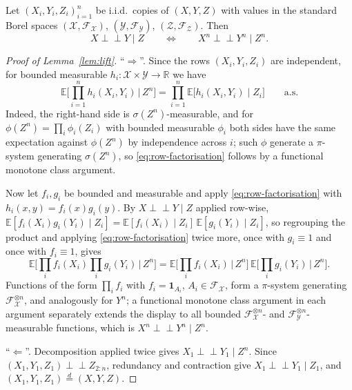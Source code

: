 \documentclass[twoside,11pt]{article}
\newcommand{\indep}{\perp \!\!\! \perp}
\begin{document}
\begin{lemma}\label{lem:lift}
Let $(X_i,Y_i,Z_i)_{i=1}^n$ be i.i.d.\ copies of $(X,Y,Z)$ with values in the
standard Borel spaces $(\mathcal X,\mathcal F_{\mathcal X})$,
$(\mathcal Y,\mathcal F_{\mathcal Y})$, $(\mathcal Z,\mathcal F_{\mathcal Z})$.
Then
\[
  X\indep Y\mid Z
  \qquad\Longleftrightarrow\qquad
  X^n\indep Y^n\mid Z^n .
\]
\end{lemma}
\begin{proof}[Proof of Lemma~\ref{lem:lift}]
``$\Rightarrow$''. Since the rows $(X_i,Y_i,Z_i)$ are independent, for bounded
measurable $h_i:\mathcal X\times\mathcal Y\to\mathbb R$ we have
\begin{equation}\label{eq:row-factorisation}
  \mathbb E\Big[\textstyle\prod_{i=1}^n h_i(X_i,Y_i)\,\Big|\,Z^n\Big]
  = \prod_{i=1}^n \mathbb E\big[h_i(X_i,Y_i)\mid Z_i\big]
  \qquad \text{a.s.}
\end{equation}
Indeed, the right-hand side is $\sigma(Z^n)$-measurable, and for
$\phi(Z^n)=\prod_i\phi_i(Z_i)$ with bounded measurable $\phi_i$ both sides have
the same expectation against $\phi(Z^n)$ by independence across $i$; such
$\phi$ generate a $\pi$-system generating $\sigma(Z^n)$, so
\eqref{eq:row-factorisation} follows by a functional monotone class argument.

Now let $f_i,g_i$ be bounded and measurable and apply
\eqref{eq:row-factorisation} with $h_i(x,y)=f_i(x)g_i(y)$. By $X\indep
Y\mid Z$ applied row-wise,
$\mathbb E[f_i(X_i)g_i(Y_i)\mid Z_i]=\mathbb E[f_i(X_i)\mid Z_i]\,
\mathbb E[g_i(Y_i)\mid Z_i]$, so regrouping the product and applying
\eqref{eq:row-factorisation} twice more, once with $g_i\equiv 1$ and once with
$f_i\equiv 1$, gives
\[
  \mathbb E\Big[\textstyle\prod_i f_i(X_i)\prod_i g_i(Y_i)\,\Big|\,Z^n\Big]
  = \mathbb E\Big[\textstyle\prod_i f_i(X_i)\,\Big|\,Z^n\Big]\,
    \mathbb E\Big[\textstyle\prod_i g_i(Y_i)\,\Big|\,Z^n\Big].
\]
Functions of the form $\prod_i f_i$ with $f_i=\mathbf 1_{A_i}$, $A_i\in\mathcal
F_{\mathcal X}$, form a $\pi$-system generating $\mathcal F_{\mathcal
X}^{\otimes n}$, and analogously for $Y^n$; a functional monotone class argument
in each argument separately extends the display to all bounded
$\mathcal F_{\mathcal X}^{\otimes n}$- and $\mathcal F_{\mathcal
Y}^{\otimes n}$-measurable functions, which is $X^n\indep Y^n\mid Z^n$.

``$\Leftarrow$''. Decomposition applied twice gives $X_1\indep Y_1\mid Z^n$.
Since $(X_1,Y_1,Z_1)\indep Z_{2:n}$, redundancy and contraction give
$X_1\indep Y_1\mid Z_1$, and $(X_1,Y_1,Z_1)\overset{d}{=}(X,Y,Z)$.
\end{proof}
\end{document}
